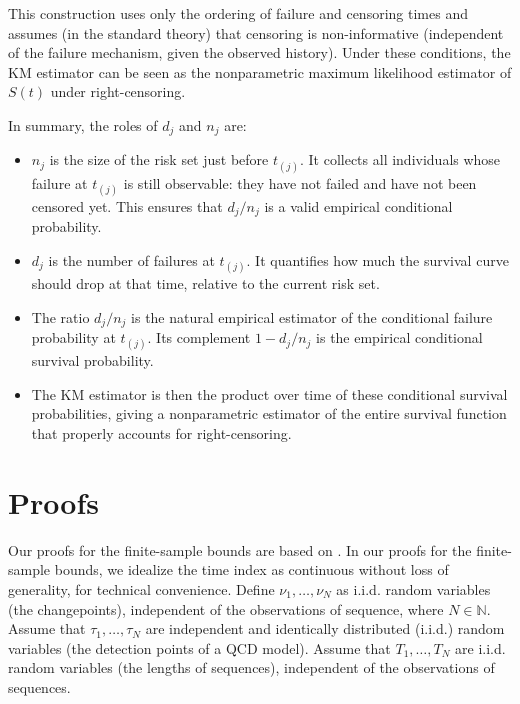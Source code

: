 \documentclass{article}
\theoremstyle{plain}
\theoremstyle{definition}
\theoremstyle{remark}
\def\mbn{\mathbb{N}}
\begin{document}
This construction uses only the ordering of failure and censoring times and assumes (in the standard theory) that censoring is non-informative (independent of the failure mechanism, given the observed history). Under these conditions, the KM estimator can be seen as the nonparametric maximum likelihood estimator of $S(t)$ under right-censoring.

In summary, the roles of $d_j$ and $n_j$ are:
\begin{itemize}
    \item $n_j$ is the size of the risk set just before $t_{(j)}$. It collects all individuals whose failure at $t_{(j)}$ is still observable: they have not failed and have not been censored yet. This ensures that $d_j/n_j$ is a valid empirical conditional probability.
    \item $d_j$ is the number of failures at $t_{(j)}$. It quantifies how much the survival curve should drop at that time, relative to the current risk set.
    \item The ratio $d_j/n_j$ is the natural empirical estimator of the conditional failure probability at $t_{(j)}$. Its complement $1-d_j/n_j$ is the empirical conditional survival probability.
    \item The KM estimator is then the product over time of these conditional survival probabilities, giving a nonparametric estimator of the entire survival function that properly accounts for right-censoring.
\end{itemize}













\section{Proofs} \label{app:Proofs}

Our proofs for the finite-sample bounds are based on \citep{stute1994bias}.
In our proofs for the finite-sample bounds, we idealize the time index as continuous without loss of generality, for technical convenience.
Define $\nu_1,\dots,\nu_N$ as i.i.d. random variables (the changepoints), independent of the observations of sequence, where $N \in \mbn$.
Assume that $\tau_1,\dots,\tau_N$ are independent and identically distributed (i.i.d.) random variables (the detection points of a QCD model).  
Assume that  $T_1,\dots,T_N$ are i.i.d. random variables (the lengths of sequences), independent of the observations of sequences.
\end{document}
